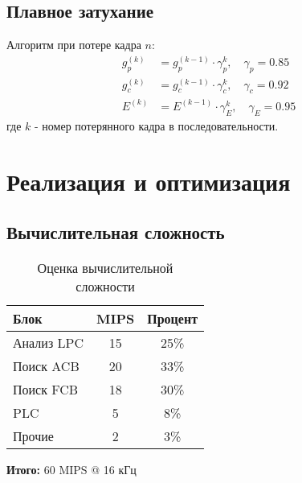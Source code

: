 \documentclass{report}
\begin{document}
	
	\section{Плавное затухание}
	Алгоритм при потере кадра $n$:
	\begin{align}
		g_p^{(k)} &= g_p^{(k-1)} \cdot \gamma_p^k, \quad \gamma_p = 0.85 \\
		g_c^{(k)} &= g_c^{(k-1)} \cdot \gamma_c^k, \quad \gamma_c = 0.92 \\
		E^{(k)} &= E^{(k-1)} \cdot \gamma_E^k, \quad \gamma_E = 0.95
	\end{align}
	где $k$ - номер потерянного кадра в последовательности.
	
	\chapter{Реализация и оптимизация}
	\section{Вычислительная сложность}
	\begin{table}[H]
		\centering
		\caption{Оценка вычислительной сложности}
		\begin{tabular}{lcc}
			\toprule
			\textbf{Блок} & \textbf{MIPS} & \textbf{Процент} \\
			\midrule
			Анализ LPC & 15 & 25\% \\
			Поиск ACB & 20 & 33\% \\
			Поиск FCB & 18 & 30\% \\
			PLC & 5 & 8\% \\
			Прочие & 2 & 3\% \\
			\bottomrule
		\end{tabular}
	\end{table}
	\textbf{Итого:} 60 MIPS @ 16 кГц
	
\end{document}
